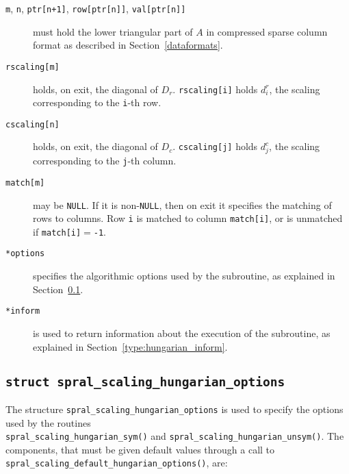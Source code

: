 \begin{description}

\item[\texttt{m}, \texttt{n}, \texttt{ptr[n+1]}, \texttt{row[ptr[n]]}, \texttt{val[ptr[n]]}] must hold the lower triangular part of $A$ in compressed sparse column format as described in Section~\ref{dataformats}.

\item[\texttt{rscaling[m]}] holds, on exit, the diagonal of $D_r$.
\texttt{rscaling[i]} holds $d^r_i$, the scaling corresponding to the
\texttt{i}-th row.

\item[\texttt{cscaling[n]}] holds, on exit, the diagonal of $D_c$.
\texttt{cscaling[j]} holds $d^c_j$, the scaling corresponding to the
\texttt{j}-th column.

\item[\texttt{match[m]}] may be \texttt{NULL}. If it is non-\texttt{NULL},
then on exit it specifies the matching of rows to columns.
Row \texttt{i} is matched to column \texttt{match[i]}, or is unmatched
if \texttt{match[i]}$=$\texttt{-1}.

\item[\texttt{*options}] specifies the algorithmic options used by the subroutine, as explained in Section~\ref{type:hungarian_options}.

\item[\texttt{*inform}] is used to return information about the execution of the subroutine, as explained in Section~\ref{type:hungarian_inform}.


\end{description}

\subsection{\texttt{struct spral\_scaling\_hungarian\_options}} \label{type:hungarian_options}

The structure \texttt{spral\_scaling\_hungarian\_options} is used to specify the
options used by the routines \\\texttt{spral\_scaling\_hungarian\_sym()} and \texttt{spral\_scaling\_hungarian\_unsym()}. The components,
that must be given default values through a call to \texttt{spral\_scaling\_default\_hungarian\_options()}, are:


